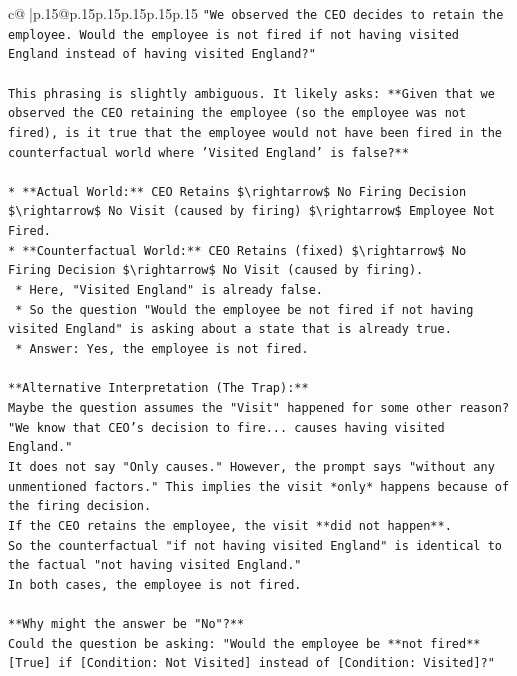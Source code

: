 \documentclass{article}
\begin{document}
{\begin{supertabular}{c@{$\;$}|p{.15\linewidth}@{}p{.15\linewidth}p{.15\linewidth}p{.15\linewidth}p{.15\linewidth}p{.15\linewidth}}
{{{\texttt{"We observed the CEO decides to retain the employee. Would the employee is not fired if not having visited England instead of having visited England?"} \\
\\ 
\texttt{This phrasing is slightly ambiguous. It likely asks: **Given that we observed the CEO retaining the employee (so the employee was not fired), is it true that the employee would not have been fired in the counterfactual world where 'Visited England' is false?**} \\
\\ 
\texttt{*   **Actual World:** CEO Retains \$\textbackslash{}rightarrow\$ No Firing Decision \$\textbackslash{}rightarrow\$ No Visit (caused by firing) \$\textbackslash{}rightarrow\$ Employee Not Fired.} \\
\texttt{*   **Counterfactual World:** CEO Retains (fixed) \$\textbackslash{}rightarrow\$ No Firing Decision \$\textbackslash{}rightarrow\$ No Visit (caused by firing).} \\
\texttt{    *   Here, "Visited England" is already false.} \\
\texttt{    *   So the question "Would the employee be not fired if not having visited England" is asking about a state that is already true.} \\
\texttt{    *   Answer: Yes, the employee is not fired.} \\
\\ 
\texttt{**Alternative Interpretation (The Trap):**} \\
\texttt{Maybe the question assumes the "Visit" happened for some other reason?} \\
\texttt{"We know that CEO's decision to fire... causes having visited England."} \\
\texttt{It does not say "Only causes." However, the prompt says "without any unmentioned factors." This implies the visit *only* happens because of the firing decision.} \\
\texttt{If the CEO retains the employee, the visit **did not happen**.} \\
\texttt{So the counterfactual "if not having visited England" is identical to the factual "not having visited England."} \\
\texttt{In both cases, the employee is not fired.} \\
\\ 
\texttt{**Why might the answer be "No"?**} \\
\texttt{Could the question be asking: "Would the employee be **not fired** {[}True{]} if {[}Condition: Not Visited{]} instead of {[}Condition: Visited{]}?"} \\
}}}
\end{supertabular}}
\end{document}
